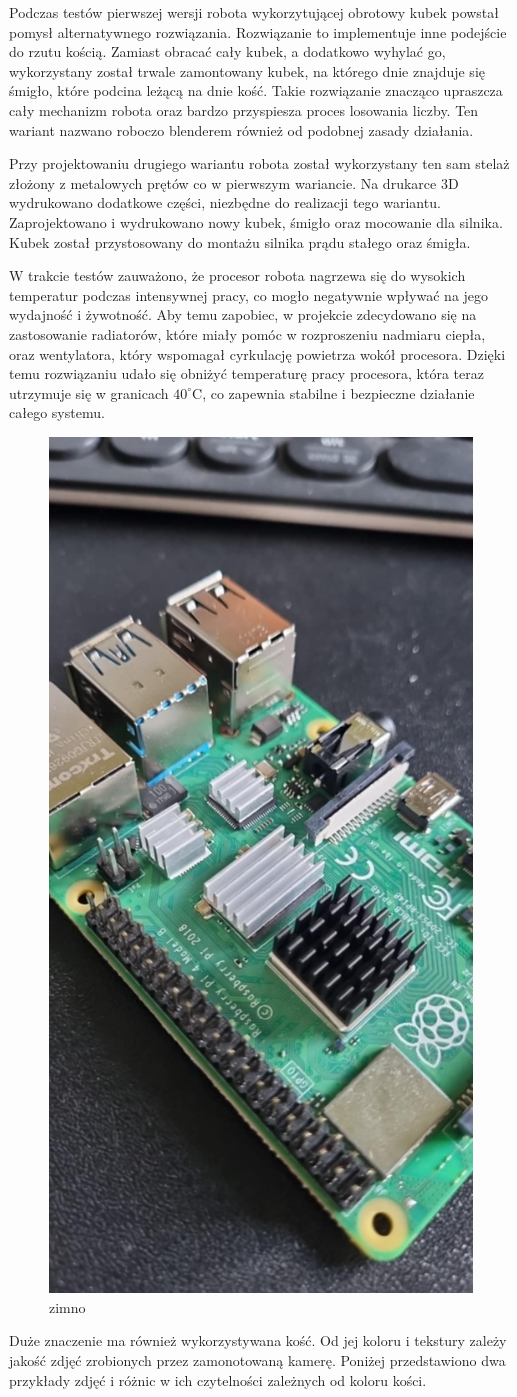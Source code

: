Podczas testów pierwszej wersji robota wykorzytującej obrotowy kubek powstał pomysł alternatywnego rozwiązania.
Rozwiązanie to implementuje inne podejście do rzutu kością. Zamiast obracać cały kubek, a dodatkowo wyhylać go,
wykorzystany został trwale zamontowany kubek, na którego dnie znajduje się śmigło, które podcina leżącą na dnie kość.
Takie rozwiązanie znacząco upraszcza cały mechanizm robota oraz bardzo przyspiesza proces losowania liczby. Ten wariant 
nazwano roboczo blenderem również od podobnej zasady działania.

Przy projektowaniu drugiego wariantu robota został wykorzystany ten sam stelaż złożony z metalowych prętów co w 
pierwszym wariancie. Na drukarce 3D wydrukowano dodatkowe części, niezbędne do realizacji tego wariantu.
Zaprojektowano i wydrukowano nowy kubek, śmigło oraz mocowanie dla silnika. Kubek został przystosowany do montażu 
silnika prądu stałego oraz śmigła.

W trakcie testów zauważono, że procesor robota nagrzewa się do wysokich temperatur podczas intensywnej pracy, 
co mogło negatywnie wpływać na jego wydajność i żywotność. Aby temu zapobiec, w projekcie zdecydowano się na 
zastosowanie radiatorów, które miały pomóc w rozproszeniu nadmiaru ciepła, oraz wentylatora, który 
wspomagał cyrkulację powietrza wokół procesora. Dzięki temu rozwiązaniu udało się obniżyć temperaturę pracy 
procesora, która teraz utrzymuje się w granicach $40^{\circ}$C, co zapewnia stabilne i bezpieczne działanie całego systemu. 

\begin{figure}[H]
    \centering
    \includegraphics[width=0.25\linewidth]{chapters/03-praca-wlasna/figures/now_we_are_cool.png}
    \caption{\label{fig:zimno}zimno}
\end{figure}

Duże znaczenie ma również wykorzystywana kość. Od jej koloru i tekstury zależy jakość zdjęć zrobionych przez
zamonotowaną kamerę. Poniżej przedstawiono dwa przykłady zdjęć i różnic w ich czytelności zależnych od koloru kości.


